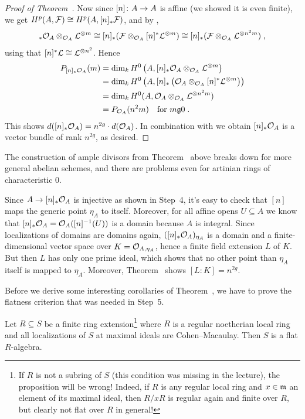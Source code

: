 \documentclass[a4paper,parskip=half,numbers=enddot, DIV=12]{scrreprt}
\begin{document}
\begin{proof}[Proof of Theorem~]
	Now since $[n]\colon A\morphism A$ is affine (we showed it is even finite), we get $H^p(A,\mathcal{F})\cong H^p(A,[n]_*\mathcal{F})$, and by \cite[Remark~2.2.7]{alggeo2},
	\begin{align*}
		[n]_*\Oo_A\otimes_{\Oo_A}\Ll^{\otimes m}\cong[n]_*(\Ff\otimes_{\Oo_A}[n]^*\Ll^{\otimes m})\cong  [n]_*(\Ff\otimes_{\Oo_A}\Ll^{\otimes n^2m})\;,
	\end{align*}
	 using that $[n]^*\mathcal{L}\cong \mathcal{L}^{\otimes n^2}$. Hence
	\begin{align*}
		P_{[n]_*\Oo_A}(m)&=\dim_kH^0\left(A,[n]_*\Oo_A\otimes_{\Oo_A}\Ll^{\otimes m}\right)\\
		&=\dim_kH^0\left(A,[n]_*\left(\Oo_A\otimes_{\Oo_A}[n]^*\Ll^{\otimes m}\right)\right)\\
		&=\dim_kH^0(A,\Oo_A\otimes_{\Oo_A}\Ll^{\otimes n^2m})\\
		&=P_{\Oo_A}(n^2m)\quad\text{for }m\gge 0\;.
	\end{align*}
	This shows $d([n]_*\mathcal{O}_A)=n^{2g}\cdot d(\mathcal{O}_A)$. In combination with  we obtain $[n]_*\mathcal{O}_A$ is a vector bundle of rank $n^{2g}$, as desired.
\end{proof}
\begin{rem}
	The construction of ample divisors from Theorem~ above breaks down for more general abelian schemes, and there are problems even for artinian rings of characteristic $0$.
\end{rem}
\begin{rem}
	Since $A\morphism[][n]_*\Oo_A$ is injective as shown in Step~4, it's easy to check that $[n]$ maps the generic point $\eta_A$ to itself. Moreover, for all affine opens $U\subseteq A$ we know that $[n]_*\mathcal{O}_A=\mathcal{O}_A([n]^{-1}(U))$ is a domain because $A$ is integral. Since localizations of domains are domains again, $([n]_*\mathcal{O}_A)_{\eta_A}$ is a domain and a finite-dimensional vector space over $K=\mathcal{O}_{A,\eta_A}$, hence a finite field extension $L$ of $K$. But then $L$ has only one prime ideal, which shows that no other point than $\eta_A$ itself is mapped to $\eta_A$. Moreover, Theorem~ shows $[L:K]=n^{2g}$.
\end{rem}
Before we derive some interesting corollaries of Theorem~, we have to prove the flatness criterion that was needed in Step~5.
\begin{prop}
Let $R\subseteq S$ be a finite ring extension\footnote{If $R$ is not a subring of $S$ (this condition was missing in the lecture), the proposition will be wrong! Indeed, if $R$ is any regular local ring and $x\in \mathfrak{m}$ an element of its maximal ideal, then $R/xR$ is regular again and finite over $R$, but clearly not flat over $R$ in general!} where $R$ is a  regular noetherian local ring and all localizations of $S$ at maximal ideals are Cohen--Macaulay. Then $S$ is a flat $R$-algebra.
\end{prop}
\end{document}
